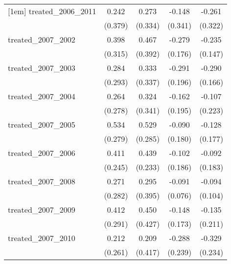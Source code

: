 {\begin{tabular}{l*{4}{c}}
[1em]
treated\_2006\_2011&       0.242         &       0.273         &      -0.148         &      -0.261         \\
            &     (0.379)         &     (0.334)         &     (0.341)         &     (0.322)         \\
[1em]
treated\_2007\_2002&       0.398         &       0.467         &      -0.279         &      -0.235         \\
            &     (0.315)         &     (0.392)         &     (0.176)         &     (0.147)         \\
[1em]
treated\_2007\_2003&       0.284         &       0.333         &      -0.291         &      -0.290         \\
            &     (0.293)         &     (0.337)         &     (0.196)         &     (0.166)         \\
[1em]
treated\_2007\_2004&       0.264         &       0.324         &      -0.162         &      -0.107         \\
            &     (0.278)         &     (0.341)         &     (0.195)         &     (0.223)         \\
[1em]
treated\_2007\_2005&       0.534         &       0.529         &      -0.090         &      -0.128         \\
            &     (0.279)         &     (0.285)         &     (0.180)         &     (0.177)         \\
[1em]
treated\_2007\_2006&       0.411         &       0.439         &      -0.102         &      -0.092         \\
            &     (0.245)         &     (0.233)         &     (0.186)         &     (0.183)         \\
[1em]
treated\_2007\_2008&       0.271         &       0.295         &      -0.091         &      -0.094         \\
            &     (0.282)         &     (0.395)         &     (0.076)         &     (0.104)         \\
[1em]
treated\_2007\_2009&       0.412         &       0.450         &      -0.148         &      -0.135         \\
            &     (0.291)         &     (0.427)         &     (0.173)         &     (0.211)         \\
[1em]
treated\_2007\_2010&       0.212         &       0.209         &      -0.288         &      -0.329         \\
            &     (0.261)         &     (0.417)         &     (0.239)         &     (0.234)         \\

\end{tabular}}
